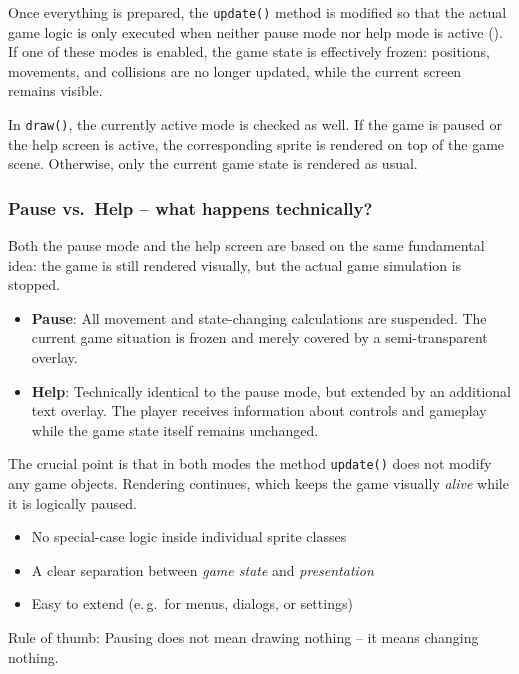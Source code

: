 Once everything is prepared, the \texttt{update()} method is modified so that the actual game logic is only executed when neither pause mode nor help mode is active (). If one of these modes is enabled, the game state is effectively frozen: positions, movements, and collisions are no longer updated, while the current screen remains visible.


In \texttt{draw()}, the currently active mode is checked as well. If the game is paused or the help screen is active, the corresponding sprite is rendered on top of the game scene. Otherwise, only the current game state is rendered as usual.



\subsubsection*{Pause vs.\ Help -- what happens technically?}

Both the pause mode and the help screen are based on the same fundamental idea: the game is still rendered visually, but the actual game simulation is stopped.

\begin{itemize}
	\item \textbf{Pause}:
	All movement and state-changing calculations are suspended.	The current game situation is frozen and merely covered by a semi-transparent overlay.
	
	\item \textbf{Help}:
	Technically identical to the pause mode, but extended by an additional text overlay. The player receives information about controls and gameplay while the game state itself remains unchanged.
\end{itemize}

The crucial point is that in both modes the method \texttt{update()} does not modify any game objects. Rendering continues, which keeps the game visually \emph{alive} while it is logically paused.

\begin{hintbox}
\begin{itemize}
	\item No special-case logic inside individual sprite classes
	\item A clear separation between \emph{game state} and \emph{presentation}
	\item Easy to extend (e.\,g.\ for menus, dialogs, or settings)
\end{itemize}

Rule of thumb: Pausing does not mean drawing nothing -- it means changing nothing.
\end{hintbox}

